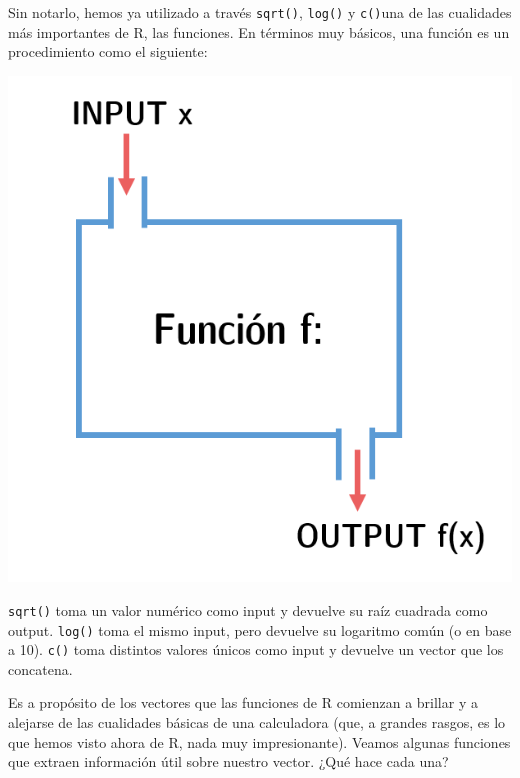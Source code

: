 \documentclass[]{book}
\begin{document}
Sin notarlo, hemos ya utilizado a través \texttt{sqrt()}, \texttt{log()}
y \texttt{c()}una de las cualidades más importantes de R, las funciones.
En términos muy básicos, una función es un procedimiento como el
siguiente:

\begin{center}\includegraphics[width=8.54in]{00-images/rbas-funs} \end{center}

\texttt{sqrt()} toma un valor numérico como input y devuelve su raíz
cuadrada como output. \texttt{log()} toma el mismo input, pero devuelve
su logaritmo común (o en base a 10). \texttt{c()} toma distintos valores
únicos como input y devuelve un vector que los concatena.

Es a propósito de los vectores que las funciones de R comienzan a
brillar y a alejarse de las cualidades básicas de una calculadora (que,
a grandes rasgos, es lo que hemos visto ahora de R, nada muy
impresionante). Veamos algunas funciones que extraen información útil
sobre nuestro vector. ¿Qué hace cada una?
\end{document}
